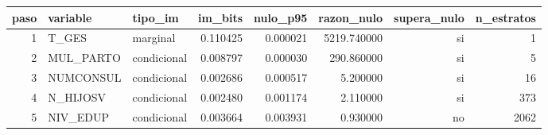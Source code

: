 \begin{tabular}{rllrrrrr}
\toprule
paso & variable & tipo\_im & im\_bits & nulo\_p95 & razon\_nulo & supera\_nulo & n\_estratos \\
\midrule
1 & T\_GES & marginal & 0.110425 & 0.000021 & 5219.740000 & si & 1 \\
2 & MUL\_PARTO & condicional & 0.008797 & 0.000030 & 290.860000 & si & 5 \\
3 & NUMCONSUL & condicional & 0.002686 & 0.000517 & 5.200000 & si & 16 \\
4 & N\_HIJOSV & condicional & 0.002480 & 0.001174 & 2.110000 & si & 373 \\
5 & NIV\_EDUP & condicional & 0.003664 & 0.003931 & 0.930000 & no & 2062 \\
\bottomrule
\end{tabular}
